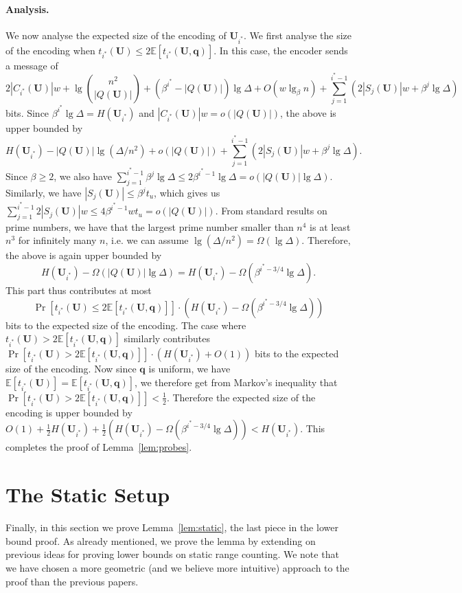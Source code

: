 \documentclass[letterpaper]{article}
\newcommand{\E}{\mathbb{E}}
\newcommand{\is}{{i^*}}
\newcommand{\U}{\textbf{U}}
\newcommand{\q}{\textbf{q}}
\begin{document}
\paragraph{Analysis.}
We now analyse the expected size of the encoding of
$\U_\is$. We first analyse the size of the encoding when
$t_\is(\U) \leq 2\E[t_\is(\U,\q)]$. In this case, the encoder sends a
message of
\[
2|C_\is(\U)|w+\lg\binom{n^2}{|Q(\U)|}+(\beta^\is-|Q(\U)|)\lg \Delta
+O(w \lg_\beta n)+\sum_{j=1}^{\is-1}(2|S_j(\U)|w+\beta^j\lg \Delta)
\]
bits. Since $\beta^\is \lg \Delta = H(\U_\is)$ and
$|C_\is(\U)|w=o(|Q(\U)|)$, the above is upper bounded by
\[
H(\U_\is)-|Q(\U)|\lg(\Delta/n^2)+o(|Q(\U)|)
+\sum_{j=1}^{\is-1}(2|S_j(\U)|w+\beta^j\lg \Delta).
\]
Since $\beta \geq 2$, we also have $\sum_{j=1}^{\is-1} \beta^j \lg
\Delta \leq 2\beta^{\is-1}\lg \Delta=o(|Q(\U)|\lg \Delta)$. Similarly, we
have $|S_j(\U)| \leq \beta^j t_u$, which gives us
$\sum_{j=1}^{\is-1}2|S_j(\U)|w \leq 4\beta^{\is-1}wt_u=o(|Q(\U)|)$. From
standard results on prime numbers, we have that the largest prime
number smaller than $n^4$ is at least $n^3$ for infinitely many $n$,
i.e. we can assume $\lg(\Delta/n^2)=\Omega(\lg \Delta)$. Therefore,
the above is again upper bounded by
\[
H(\U_\is)-\Omega(|Q(\U)|\lg \Delta)=H(\U_\is)-\Omega(\beta^{\is-3/4}\lg \Delta).
\]
This part thus contributes at most
\[
\Pr[t_\is(\U) \leq 2 \E[t_\is(\U,\q)]] \cdot
(H(\U_\is)-\Omega(\beta^{\is-3/4}\lg \Delta))
\]
bits to the expected size of the encoding. The case where
$t_\is(\U)>2\E[t_\is(\U,\q)]$ similarly contributes
$
\Pr[t_\is(\U) > 2 \E[t_\is(\U,\q)]] \cdot (H(\U_\is)+O(1))
$
bits to the expected size of the encoding. Now since $\q$ is uniform, we have
$\E[t_\is(\U)]=\E[t_\is(\U,\q)]$, we therefore get from
Markov's inequality that $\Pr[t_\is(\U) > 2 \E[t_\is(\U,\q)]]<\tfrac{1}{2}$.
Therefore the expected size of the encoding is upper bounded by
$
O(1)+\tfrac{1}{2}H(\U_\is)+\tfrac{1}{2}(H(\U_\is)-\Omega(\beta^{\is-3/4} \lg
\Delta)) < H(\U_\is).
$
This completes the proof of
Lemma~\ref{lem:probes}.


\section{The Static Setup}
\label{sec:static}
Finally, in this section we prove Lemma~\ref{lem:static}, the last
piece in the lower bound proof. As already mentioned, we prove the
lemma by extending on previous ideas for proving lower bounds on
static range counting. We note that we have chosen a more geometric
(and we believe more intuitive) approach to the proof than the
previous papers.
\end{document}

